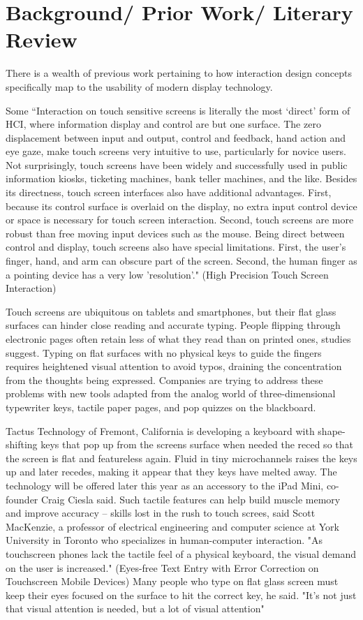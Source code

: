 \documentclass{article}
\begin{document}
\section{Background/ Prior Work/ Literary Review}
There is a wealth of previous work pertaining to how interaction design concepts specifically map to the usability of modern display technology. 

Some ``Interaction on touch sensitive screens is literally the most `direct' form of HCI, where information display and control are but one surface. The zero displacement between input and output, control and feedback, hand action and eye gaze, make touch screens very intuitive to use, particularly for novice users. Not surprisingly, touch screens have been widely and successfully used in public information kiosks, ticketing machines, bank teller machines, and the like. Besides its directness, touch screen interfaces also have additional advantages. First, because its control surface is overlaid on the display, no extra input control device or space is necessary for touch screen interaction. Second, touch screens are more robust than free moving input devices such as the mouse. Being direct between control and display, touch screens also have special limitations. First, the user's finger, hand, and arm can obscure part of the screen. Second, the human finger as a pointing device has a very low 'resolution'." \cite{Apple} (High Precision Touch Screen Interaction)

Touch screens are ubiquitous on tablets and smartphones, but their flat glass surfaces can hinder close reading and accurate typing. People flipping through electronic pages often retain less of what they read than on printed ones, studies suggest. Typing on flat surfaces with no physical keys to guide the fingers requires heightened visual attention to avoid typos, draining the concentration from the thoughts being expressed. Companies are trying to address these problems with new tools adapted from the analog world of three-dimensional typewriter keys, tactile paper pages, and pop quizzes on the blackboard.

Tactus Technology of Fremont, California is developing a keyboard with shape-shifting keys that pop up from the screens surface when needed the reced so that the screen is flat and featureless again. Fluid in tiny microchannels raises the keys up and later recedes, making it appear that they keys have melted away. The technology will be offered later this year as an accessory to the iPad Mini, co-founder Craig Ciesla said. Such tactile features can help build muscle memory and improve accuracy -- skills lost in the rush to touch screes, said Scott MacKenzie, a professor of electrical engineering and computer science at York University in Toronto who specializes in human-computer interaction. "As touchscreen phones lack the tactile feel of a physical keyboard, the visual demand on the user is increased." (Eyes-free Text Entry with Error Correction on Touchscreen Mobile Devices) Many people who type on flat glass screen must keep their eyes focused on the surface to hit the correct key, he said. "It's not just that visual attention is needed, but a lot of visual attention"
\end{document}
